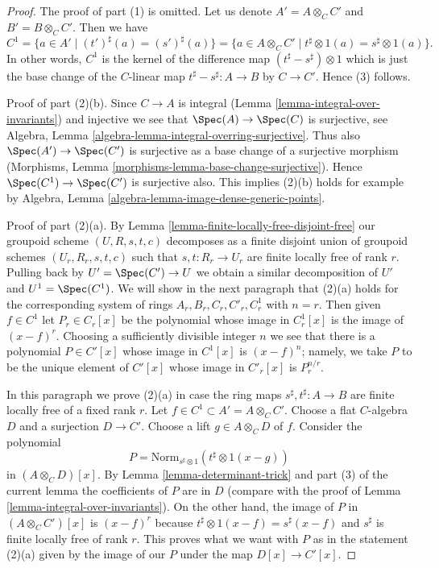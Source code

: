 \begin{proof}
The proof of part (1) is omitted. Let us denote $A' = A \otimes_C C'$ and
$B' = B \otimes_C C'$. Then we have
$$
C^1
= \{a \in A' \mid (t')^\sharp(a) = (s')^\sharp(a) \}
= \{a \in A \otimes_C C' \mid t^\sharp \otimes 1(a) = s^\sharp \otimes 1(a) \}.
$$
In other words, $C^1$ is the kernel of the difference map
$(t^\sharp - s^\sharp) \otimes 1$ which is just the base change
of the $C$-linear map $t^\sharp - s^\sharp : A \to B$ by $C \to C'$.
Hence (3) follows.

\medskip\noindent
Proof of part (2)(b). Since $C \to A$ is integral
(Lemma \ref{lemma-integral-over-invariants}) and injective we see that
$\Spec(A) \to \Spec(C)$ is surjective, see
Algebra, Lemma \ref{algebra-lemma-integral-overring-surjective}.
Thus also $\Spec(A') \to \Spec(C')$ is surjective
as a base change of a surjective morphism
(Morphisms, Lemma \ref{morphisms-lemma-base-change-surjective}).
Hence $\Spec(C^1) \to \Spec(C')$ is surjective also.
This implies (2)(b) holds for example by
Algebra, Lemma \ref{algebra-lemma-image-dense-generic-points}.

\medskip\noindent
Proof of part (2)(a). By Lemma \ref{lemma-finite-locally-free-disjoint-free}
our groupoid scheme $(U, R, s, t, c)$ decomposes as a finite disjoint union
of groupoid schemes $(U_r, R_r, s, t, c)$ such that $s, t : R_r \to U_r$
are finite locally free of rank $r$. Pulling back by $U' = \Spec(C') \to U$
we obtain a similar decomposition of $U'$ and $U^1 = \Spec(C^1)$.
We will show in the next paragraph that (2)(a) holds for the corresponding
system of rings $A_r, B_r, C_r, C'_r, C^1_r$ with $n = r$.
Then given $f \in C^1$ let $P_r \in C_r[x]$ be the polynomial
whose image in $C^1_r[x]$ is the image of $(x - f)^r$.
Choosing a sufficiently divisible integer $n$ we see that
there is a polynomial $P \in C'[x]$ whose image in $C^1[x]$ is
$(x - f)^n$; namely, we take $P$ to be the unique element of
$C'[x]$ whose image in $C'_r[x]$ is $P_r^{n/r}$.

\medskip\noindent
In this paragraph we prove (2)(a) in case the ring maps
$s^\sharp, t^\sharp : A \to B$ are finite locally free of a fixed rank $r$.
Let $f \in C^1 \subset A' = A \otimes_C C'$. Choose a flat
$C$-algebra $D$ and a surjection $D \to C'$. Choose a lift
$g \in A \otimes_C D$ of $f$.
Consider the polynomial
$$
P = \text{Norm}_{s^\sharp \otimes 1}(t^\sharp \otimes 1(x - g))
$$
in $(A \otimes_C D)[x]$. By Lemma \ref{lemma-determinant-trick}
and part (3) of the current lemma the coefficients of $P$ are in $D$
(compare with the proof of Lemma \ref{lemma-integral-over-invariants}).
On the other hand, the image of $P$ in $(A \otimes_C C')[x]$ is
$(x - f)^r$ because $t^\sharp \otimes 1(x - f) = s^\sharp(x - f)$
and $s^\sharp$ is finite locally free of rank $r$.
This proves what we want with $P$ as in the statement (2)(a)
given by the image of our $P$ under the map $D[x] \to C'[x]$.
\end{proof}

